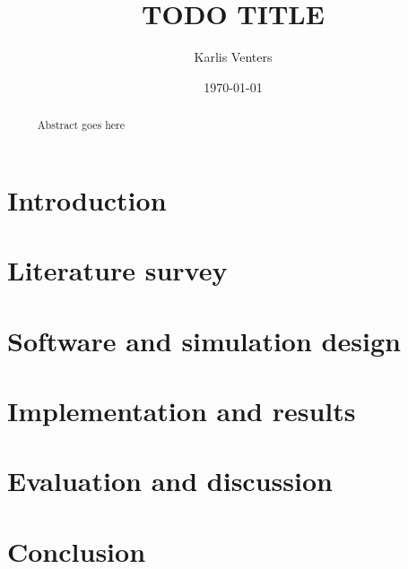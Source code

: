 \documentclass{csfourzero}
\title{TODO TITLE}
\author{Karlis Venters}
\date{\today}
\begin{document}
\maketitle

\begin{abstract}~
Abstract goes here
\end{abstract}

\newpage
\section{Introduction}
\label{sec:intro}
% 

\newpage
\section{Literature survey}
\label{sec:literature}


\newpage
\section{Software and simulation design}
\label{sec:software}
% 

\newpage
\section{Implementation and results}
\label{sec:results}
% 

\newpage
\section{Evaluation and discussion}
\label{sec:evaluation}
% 

\newpage
\section{Conclusion}
\label{sec:conclusion}
% 

\newpage
\printbibliography
\end{document}
